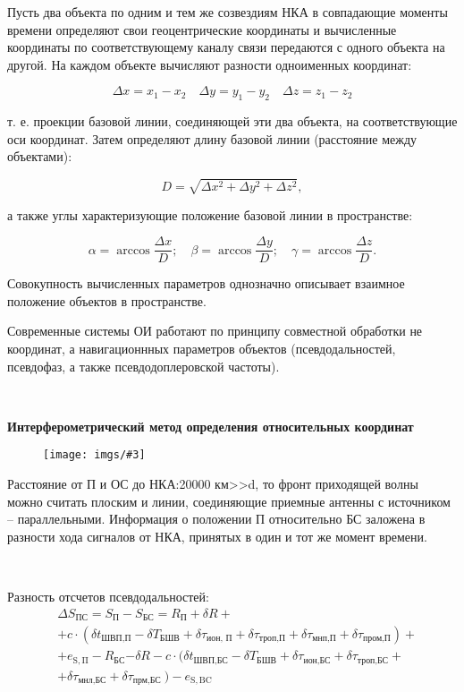 \documentclass[14pt,a4paper,oneside]{extarticle}
\newcommand{\pic}[3]{
	\begin{figure}[#1]
		\begin{center}
			\texttt{[image: imgs/\#3]}
		\end{center}
	\end{figure}
}
\begin{document}
Пусть два объекта по одним и тем же созвездиям НКА в совпадающие моменты времени определяют свои геоцентрические координаты и вычисленные координаты по соответствующему каналу связи передаются с одного объекта на другой. На каждом объекте вычисляют разности одноименных координат:

\[\Delta x=x_1-x_2\quad\Delta y=y_1-y_2\quad\Delta z=z_1-z_2\]

т. е. проекции базовой линии, соединяющей эти два объекта, на соответствующие оси координат. Затем определяют длину базовой линии (расстояние между объектами):

\[D=\sqrt{\Delta x^{2}+\Delta y^{2}+\Delta z^{2}},\]

а также углы характеризующие положение базовой линии в пространстве:

\[\alpha=\arccos\frac{\Delta x}D;\quad\beta=\arccos\frac{\Delta y}D;\quad\gamma=\arccos\frac{\Delta z}D.\]

Совокупность вычисленных параметров однозначно описывает взаимное положение объектов в пространстве.

Современные системы ОИ работают по принципу совместной обработки не координат, а навигационнных параметров объектов (псевдодальностей, псевдофаз, а также псевдодоплеровской частоты).

\

\textbf{Интерферометрический метод определения относительных координат}

\pic{H}{\textwidth}{9}

Расстояние от П и ОС до НКА:20000 км>>d, то фронт приходящей волны можно считать плоским и линии, соединяющие приемные антенны с источником – параллельными. Информация о положении П относительно БС заложена в разности хода сигналов от НКА, принятых в один и тот же момент времени.

\

Разность отсчетов псевдодальностей:
\[\begin{aligned}
         & \Delta S_{\text{ПС}} = S _ {\text{П}} - S _ {\text{БС}} = R _ {\text{П}} + \delta R +                                                                                                              \\
         & + c \cdot ( \delta t _ {\text{ШВП,П}} - \delta T _ {\text{БШВ}} + \delta \tau _ {\text{ион, П}} + \delta \tau _ {\text{троп,П}} + \delta \tau _ {\text{мнп,П}} + \delta \tau _ {\text{пром,П}} ) + \\
         & + e _ { \mathrm{S,\Pi}} - R _\text{БС}{ - \delta }R-c\cdot(\delta t_{\text{ШВП,БС}} - \delta T _ {\text{БШВ}} + \delta \tau _ {\text{ион,БС}} + \delta \tau _ {\text{троп,БС}} +                   \\
         & +  \delta \tau _ {\text{мнл,БС}} + \delta \tau _ {\text{прм,БС }} ) - e _ { \mathrm{S,BC}}
    \end{aligned}\]
\end{document}
